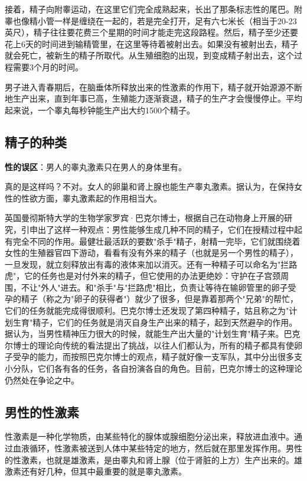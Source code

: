 接着，精子向附睾运动，在这里它们完全成熟起来，长出了那条标志性的尾巴。附睾也像精小管一样是缠绕在一起的，若是完全打开，足有六七米长（相当于20-23英尺），精子往往要花费三个星期的时间才能走完这段路程。然后，精子至少还要花上6天的时间进到输精管里，在这里等待着被射出去。如果没有被射出去，精子就会死亡，被新生的精子所取代。从生殖细胞的出现，到变成精子射出去，这个过程需要3个月的时间。

男子进入青春期后，在脑垂体所释放出来的性激素的作用下，精子就开始源源不断地生产出来，直到年事已高，生殖能力逐渐衰退，精子的生产才会慢慢停止。平均起来说，一个睾丸每秒钟能生产出大约1500个精子。

\subsection{精子的种类}

\textbf{性的误区}：男人的睾丸激素只在男人的身体里有。

真的是这样吗？不对。女人的卵巢和肾上腺也能生产睾丸激素。据认为，在保持女性的性欲方面，睾丸激素起的作用相当大。

英国曼彻斯特大学的生物学家罗宾·巴克尔博士，根据自己在动物身上开展的研究，引申出了这样一种观点：男性能够生成几种不同的精子，它们在授精过程中起有完全不同的作用。最健壮最活跃的要数"杀手"精子，射精一完毕，它们就围绕着女性的生殖器官四下游动，看看有没有外来的精子（也就是另一个男性的精子），一旦发现，就立刻释放出有毒的液体来加以消灭。还有一种精子可以命名为"拦路虎"，它的任务也是对付外来的精子，但它使用的办法更绝妙：守护在子宫颈周围，不让"外人"进去。和"杀手"与"拦路虎"相比，负责让等待在输卵管里的卵子受孕的精子（称之为"卵子的获得者"）就少了很多，但是靠着那两个"兄弟"的帮忙，它们的任务就能完成得很顺利。巴克尔博士还发现了第四种精子，姑且称之为"计划生育"精子，它们的任务就是消灭自身生产出来的精子，起到天然避孕的作用。据认为，当男性精神压力很大的时候，就能生产出大量的"计划生育"精子来。巴克尔博士的理论向传统的看法提出了挑战，以往人们都认为，所有的精子都具有使卵子受孕的能力，而按照巴克尔博士的观点，精子就好像一支军队，其中分出很多支小分队，它们各有各的任务，各自扮演各自的角色。目前，巴克尔博士的这种理论仍然处在争论之中。

\subsection{男性的性激素}

性激素是一种化学物质，由某些特化的腺体或腺细胞分泌出来，释放进血液中。通过血液循环，性激素被送到人体中某些特定的地方，然后就在那里发挥作用。男性的性激素，也就是雄激素，是由睾丸和肾上腺（位于肾脏的上方）生产出来的。雄激素还有好几种，但其中最重要的就是睾丸激素。

